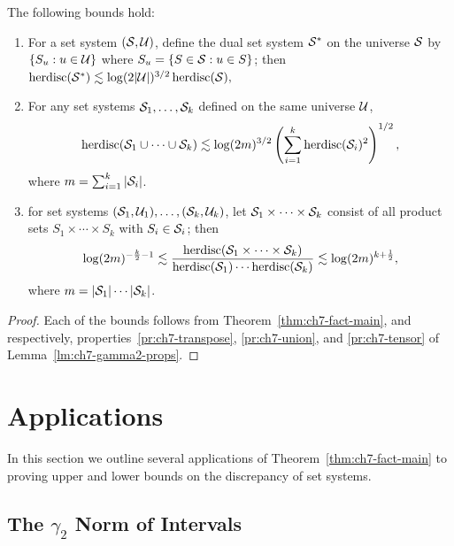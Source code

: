 \begin{theorem}\label{thm:ch7-props-ss}
  The following bounds hold:
  \begin{enumerate}
  \item \label{pr:ch7-ss-dual} For a set system $(\mathcal{S}, \mathcal{U})$, define the dual set system
    $\mathcal{S}^*$ on the universe $\mathcal{S}$ by $\{S_u: u \in \mathcal{U}\}$ where $S_u = \{S \in
    \mathcal{S}: u \in S\}$; then 
    \(
    \operatorname{herdisc}(\mathcal{S}^*) \lesssim  \log(2|\mathcal{U}|)^{3/2}\operatorname{herdisc}(\mathcal{S}),
    \)
  \item \label{pr:ch7-ss-union} For any set systems $\mathcal{S}_1, \ldots, \mathcal{S}_k$ defined on the same
    universe $\mathcal{U}$, 
 \[
    \operatorname{herdisc}(\mathcal{S}_1 \cup \cdots \cup \mathcal{S}_k)
    \lesssim
    \log(2m)^{3/2} \left(\sum_{i=1}^k \operatorname{herdisc}(\mathcal{S}_i)^2\right)^{1/2},\]
    where $m = \sum_{i=1}^k|\mathcal{S}_i|$.
    
  \item \label{pr:ch7-ss-product}  for set systems $(\mathcal{S}_1, \mathcal{U}_1), \ldots, (\mathcal{S}_k, \mathcal{U}_k)$,
    let $\mathcal{S}_1 \times \cdots \times \mathcal{S}_k$ consist of all product sets $S_1
    \times \cdots \times S_k$ with $S_i \in \mathcal{S}_i$; then
    \begin{multline*}
      \log(2m)^{ - \frac{k}{2}-1}
      \lesssim
      \frac{\operatorname{herdisc}(\mathcal{S}_1 \times \cdots \times \mathcal{S}_k)}{\operatorname{herdisc}(\mathcal{S}_1) \cdots \operatorname{herdisc}(\mathcal{S}_k)}
      \lesssim
      \log(2m)^{k + \frac12},
    \end{multline*}
    where $m = |\mathcal{S}_1|\cdots |\mathcal{S}_k|$.
  \end{enumerate}
\end{theorem}
\begin{proof}
  Each of the bounds follows from Theorem~\ref{thm:ch7-fact-main}, and
  respectively, properties~\ref{pr:ch7-transpose}, \ref{pr:ch7-union}, and
  \ref{pr:ch7-tensor} of Lemma~\ref{lm:ch7-gamma2-props}. 
\end{proof}

\section{Applications}

In this section we outline several applications of
Theorem~\ref{thm:ch7-fact-main} to proving upper and lower bounds on
the discrepancy of set systems.

\subsection{The $\gamma_2$ Norm of Intervals}

